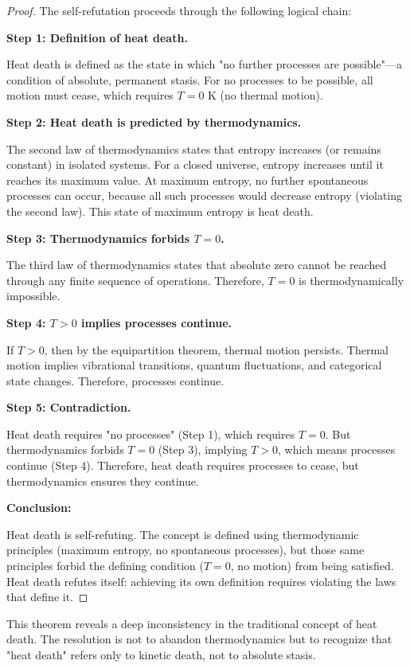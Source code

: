\documentclass[12pt,a4paper]{article}
\theoremstyle{definition}
\theoremstyle{remark}
\begin{document}
\begin{proof}
The self-refutation proceeds through the following logical chain:

\textbf{Step 1: Definition of heat death.}

Heat death is defined as the state in which "no further processes are possible"—a condition of absolute, permanent stasis. For no processes to be possible, all motion must cease, which requires $T = 0$ K (no thermal motion).

\textbf{Step 2: Heat death is predicted by thermodynamics.}

The second law of thermodynamics states that entropy increases (or remains constant) in isolated systems. For a closed universe, entropy increases until it reaches its maximum value. At maximum entropy, no further spontaneous processes can occur, because all such processes would decrease entropy (violating the second law). This state of maximum entropy is heat death.

\textbf{Step 3: Thermodynamics forbids $T = 0$.}

The third law of thermodynamics states that absolute zero cannot be reached through any finite sequence of operations. Therefore, $T = 0$ is thermodynamically impossible.

\textbf{Step 4: $T > 0$ implies processes continue.}

If $T > 0$, then by the equipartition theorem, thermal motion persists. Thermal motion implies vibrational transitions, quantum fluctuations, and categorical state changes. Therefore, processes continue.

\textbf{Step 5: Contradiction.}

Heat death requires "no processes" (Step 1), which requires $T = 0$. But thermodynamics forbids $T = 0$ (Step 3), implying $T > 0$, which means processes continue (Step 4). Therefore, heat death requires processes to cease, but thermodynamics ensures they continue.

\textbf{Conclusion:}

Heat death is self-refuting. The concept is defined using thermodynamic principles (maximum entropy, no spontaneous processes), but those same principles forbid the defining condition ($T = 0$, no motion) from being satisfied. Heat death refutes itself: achieving its own definition requires violating the laws that define it.
\end{proof}

This theorem reveals a deep inconsistency in the traditional concept of heat death. The resolution is not to abandon thermodynamics but to recognize that "heat death" refers only to kinetic death, not to absolute stasis.
\end{document}

